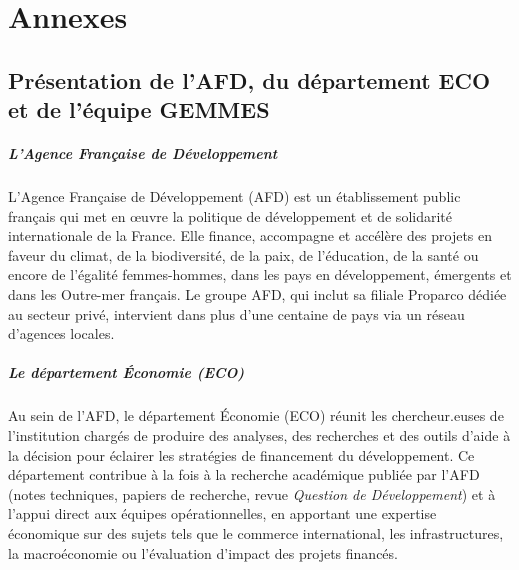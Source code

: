 \documentclass[12pt,a4paper,french]{report}
\begin{document}
	\nocite{Barrot2016, BenAkiva2013, Combes2012, deJong2013, Dietzenbacher2013,
		Felbermayr2014, Gabaix2011, Guan2020, Guilbault2009, Hallegatte2013,
		Hallegatte2017, Henriet2012, Hsiang2010, Koks2016, Liedtke2009,
		Lucas1977, Maoh2008, McFadden1974, MINIRENA2011, Okuyama2014, Ortuzar2011,
		Pichler2022, Poledna2018, Rose2007, Rose2005, Rozenberg2019,
		Santos2004, Tavasszy2014, Tsuchiya2007}
		
		\printbibliography[heading=none]
		
		\newpage
		
		\chapter{Annexes}
		
		\section{Présentation de l'AFD, du département ECO et de l'équipe GEMMES}
		\label{subsubsec:annexe_afd_gemmes}
		
		\paragraph{L'Agence Française de Développement}
		L'Agence Française de Développement (AFD) est un établissement public français qui met en œuvre la politique de développement et de solidarité internationale de la France. Elle finance, accompagne et accélère des projets en faveur du climat, de la biodiversité, de la paix, de l'éducation, de la santé ou encore de l'égalité femmes-hommes, dans les pays en développement, émergents et dans les Outre-mer français. Le groupe AFD, qui inclut sa filiale Proparco dédiée au secteur privé, intervient dans plus d'une centaine de pays via un réseau d'agences locales.
		
		\paragraph{Le département Économie (ECO)}
		Au sein de l'AFD, le département Économie (ECO) réunit les chercheur.euses de l'institution chargés de produire des analyses, des recherches et des outils d'aide à la décision pour éclairer les stratégies de financement du développement. Ce département contribue à la fois à la recherche académique publiée par l'AFD (notes techniques, papiers de recherche, revue \textit{Question de Développement}) et à l'appui direct aux équipes opérationnelles, en apportant une expertise économique sur des sujets tels que le commerce international, les infrastructures, la macroéconomie ou l'évaluation d'impact des projets financés.
		
\end{document}
